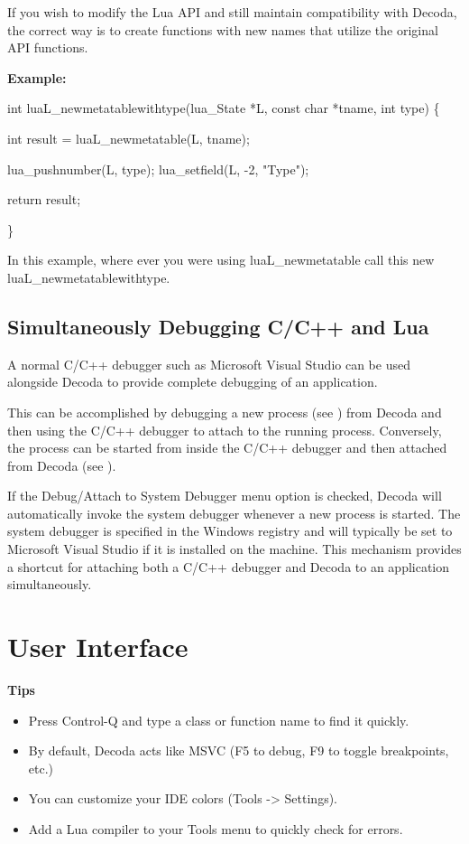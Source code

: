 If you wish to modify the Lua API and still maintain compatibility with Decoda, the correct way is to create
functions with new names that utilize the original API functions.

\textbf{Example:}

{\verbatim int luaL_newmetatablewithtype(lua_State *L, const char *tname, int type) \{
  
    int result = luaL_newmetatable(L, tname);

    lua_pushnumber(L, type);
    lua_setfield(L, -2, "Type");

    return result;

\} }

In this example, where ever you were using luaL_newmetatable call this new luaL_newmetatablewithtype.

\section{Simultaneously Debugging C/C++ and Lua}

A normal C/C++ debugger such as Microsoft Visual Studio can be used alongside Decoda to
provide complete debugging of an application.

This can be accomplished by debugging a new process (see )
from Decoda and then using the C/C++ debugger to attach to the running process.  Conversely, the process can
be started from inside the C/C++ debugger and then attached from Decoda (see
).

If the Debug/Attach to System Debugger menu option is checked, Decoda will automatically invoke the system
debugger whenever a new process is started. The system debugger is specified in the Windows registry and will
typically be set to Microsoft Visual Studio if it is installed on the machine. This mechanism provides a shortcut
for attaching both a C/C++ debugger and Decoda to an application simultaneously.

\chapter{User Interface}\label{user_interface}
%
%
\setfooter{\thepage}{}{}{}{}{\thepage}%

\textbf{Tips}
\begin{itemize}
\item Press Control-Q and type a class or function name to find it quickly.
\item By default, Decoda acts like MSVC (F5 to debug, F9 to toggle breakpoints, etc.)
\item You can customize your IDE colors (Tools -> Settings).
\item Add a Lua compiler to your Tools menu to quickly check for errors.
\end{itemize}

